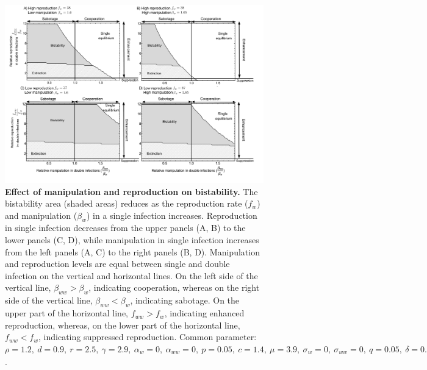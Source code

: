 \documentclass[a4paper]{scrartcl}
\begin{document}
\begin{figure}[!ht]
\captionsetup{format=plain}
\centering
\includegraphics[width=\textwidth]{manip_bifur.pdf}
\caption{\textbf{Effect of manipulation and reproduction on bistability.}
The bistability area (shaded areas) reduces as the reproduction rate ($f_w$) and manipulation ($\beta_w$) in a single infection increases. 
Reproduction in single infection decreases from the upper panels (A, B) to the lower panels (C, D), while manipulation in single infection increases from the left panels (A, C) to the right panels (B, D). Manipulation and reproduction levels are equal between single and double infection on the vertical and horizontal lines. On the left side of the vertical line, $\beta_{ww} > \beta_{w}$, indicating cooperation, whereas on the right side of the vertical line, $\beta_{ww} < \beta_{w}$, indicating sabotage. On the upper part of the horizontal line, $f_{ww} > f_w$, indicating enhanced reproduction, whereas, on the lower part of the horizontal line, $f_{ww} < f_w$, indicating suppressed reproduction.
Common parameter:  $\rho = 1.2, \ d = 0.9, \ r = 2.5, \ \gamma = 2.9, \ \alpha_w = 0, \ \alpha_{ww} = 0, \ p = 0.05, \ c = 1.4, \ \mu = 3.9, \ \sigma_w = 0, \ \sigma_{ww} = 0, \ q = 0.05, \ \delta = 0.9, \ k = 0.26, \  \beta_w = 1.65, h = 0.6$.}
\label{fig:manipbifur}
\end{figure}
\end{document}
